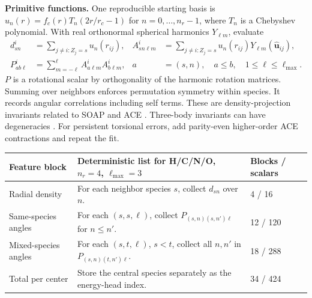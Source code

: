\documentclass[11pt,a4paper]{article}
\begin{document}
\textbf{Primitive functions.} One reproducible starting basis is $u_n(r)=f_c(r)T_n(2r/r_c-1)$ for $n=0,\ldots,n_r-1$, where $T_n$ is a Chebyshev polynomial. With real orthonormal spherical harmonics $Y_{\ell m}$, evaluate
\begin{align}
 d^i_{sn}&=\sum_{j\ne i:Z_j=s}u_n(r_{ij}),&
 A^i_{sn\ell m}&=\sum_{j\ne i:Z_j=s}u_n(r_{ij})Y_{\ell m}(\hat{\mathbf u}_{ij}),\nonumber\\
 P^i_{ab\ell}&=\sum_{m=-\ell}^{\ell} A^i_{a\ell m}A^i_{b\ell m},
   & a&=(s,n),\quad a\le b,\quad 1\le\ell\le\ell_{\max}.
 \label{eq:feat}
\end{align}
$P$ is a rotational scalar by orthogonality of the harmonic rotation matrices. Summing over neighbors enforces permutation symmetry within species. It records angular correlations including self terms. These are density-projection invariants related to SOAP and ACE \cite{soap,ace,tensorred}. Three-body invariants can have degeneracies \cite{incomplete}. For persistent torsional errors, add parity-even higher-order ACE contractions and repeat the fit.

\begin{center}\small
\begin{tabularx}{\linewidth}{@{}p{26mm}Xp{32mm}@{}}\toprule
Feature block & Deterministic list for H/C/N/O, $n_r=4$, $\ell_{\max}=3$ & Blocks / scalars\\\midrule
Radial density & For each neighbor species $s$, collect $d_{sn}$ over $n$. & 4 / 16\\
Same-species angles & For each $(s,s,\ell)$, collect $P_{(s,n)(s,n')\ell}$ for $n\le n'$. & 12 / 120\\
Mixed-species angles & For each $(s,t,\ell)$, $s<t$, collect all $n,n'$ in $P_{(s,n)(t,n')\ell}$. & 18 / 288\\\midrule
Total per center & Store the central species separately as the energy-head index. & 34 / 424\\\bottomrule
\end{tabularx}
\end{center}
\end{document}
